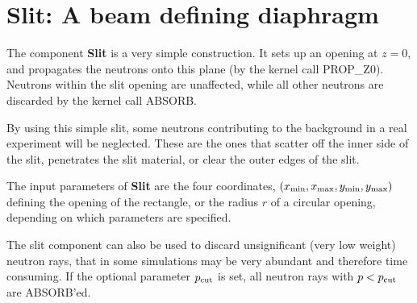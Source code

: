 \section{Slit: A beam defining diaphragm}
\label{slit}


The component {\bf Slit} is a very simple construction.
It sets up an opening at $z=0$, and propagates the neutrons 
onto this plane (by the kernel call PROP\_Z0).
Neutrons within the slit opening are unaffected, 
while all other neutrons
are discarded by the kernel call ABSORB.

By using this simple slit, some neutrons contributing to the background
in a real experiment will be neglected. 
These are the ones that scatter off the inner side
of the slit, penetrates the slit material, 
or clear the outer edges of the slit.

The input parameters of {\bf Slit} are the four coordinates,
$(x_{\rm min}, x_{\rm max}, y_{\rm min}, y_{\rm max})$
defining the opening of the rectangle, or the radius $r$ of 
a circular opening, depending on which parameters are specified.

The slit component can also be used to discard unsignificant (very low weight)
neutron rays, that in some simulations may be very abundant and therefore
time consuming. If the optional parameter $p_{\rm cut}$ is set, all
neutron rays with $p<p_{\rm cut}$ are ABSORB'ed.


